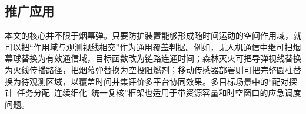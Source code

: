 \subsection{推广应用}

本文的核心并不限于烟幕弹。只要防护装置能够形成随时间运动的空间作用域，就可以把“作用域与观测视线相交”作为通用覆盖判据。例如，无人机通信中继可把烟幕球替换为有效通信域，目标函数改为链路连通时间；森林灭火可把导弹视线替换为火线传播路径，把烟幕弹替换为空投阻燃剂；移动传感器部署则可把完整圆柱替换为待观测区域，以覆盖时间并集评价多平台协同效果。多目标场景中的“配对探针--任务分配--连续细化--统一复核”框架也适用于带资源容量和时空窗口的应急调度问题。

\endinput
\section{模型的评价与推广}
